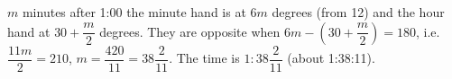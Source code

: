 $m$ minutes after 1:00 the minute hand is at $6m$ degrees (from 12) and the hour hand at $30+\dfrac {m}{2}$ degrees. They are opposite when $6m-\left(30+\dfrac {m}{2}\right)=180$, i.e. $\dfrac{11m}{2}=210$, $m=\dfrac{420}{11}=38\dfrac{2}{11}$. The time is $\boxed{1{:}38\dfrac{2}{11}}$ (about 1:38:11).
